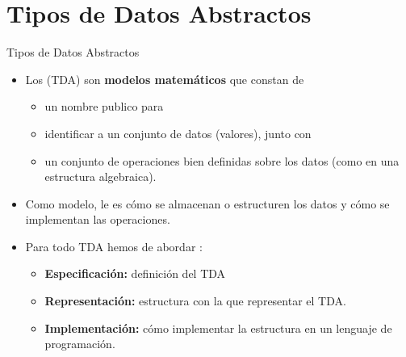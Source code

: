 \documentclass[10pt,envcountsect,spanish]{beamer}
\begin{document}
\section{Tipos de Datos Abstractos}
\begin{frame}{Tipos de Datos Abstractos}

\begin{itemize}
\item  Los  (TDA) son \textbf{modelos matemáticos} que constan de

\begin{itemize}
\item un nombre publico para 
\item identificar a un conjunto de datos (valores), junto con
\item un conjunto de operaciones bien definidas sobre los datos (como en una estructura algebraica). 
\end{itemize}

\item Como modelo, le es  cómo se almacenan o estructuren los datos y cómo se implementan las operaciones.

\item Para todo TDA hemos de abordar : 

\begin{itemize}
\item \textbf{Especificación:} definición del TDA 
\item \textbf{Representación:} estructura con la que representar el TDA.
\item \textbf{Implementación:} cómo implementar la estructura en un lenguaje de programación.
\end{itemize}

\end{itemize}
\end{frame}




\end{document}
